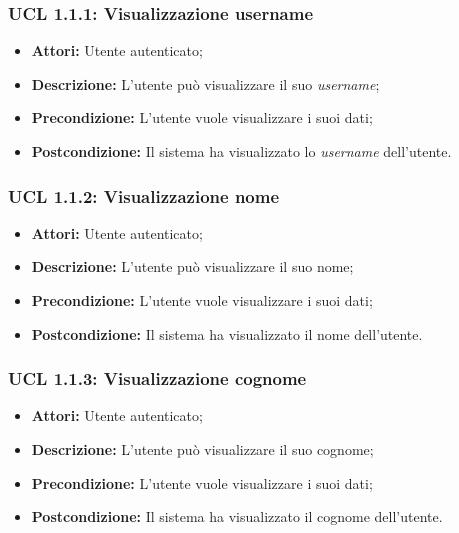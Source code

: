 \hypertarget{L1.1.1}{}
\subsubsection{UCL 1.1.1: Visualizzazione username}
\begin{itemize}
	\item \textbf{Attori:} Utente autenticato;
	\item \textbf{Descrizione:} L'utente può visualizzare il suo \textit{username};
	\item \textbf{Precondizione:} L'utente vuole visualizzare i suoi dati;
\item \textbf{Postcondizione:} Il sistema ha visualizzato lo \textit{username} dell'utente.
\end{itemize}

\hypertarget{L1.1.2}{}
\subsubsection{UCL 1.1.2: Visualizzazione nome}
\begin{itemize}
	\item \textbf{Attori:} Utente autenticato;
	\item \textbf{Descrizione:} L'utente può visualizzare il suo nome;
	\item \textbf{Precondizione:} L'utente vuole visualizzare i suoi dati;
	\item \textbf{Postcondizione:} Il sistema ha visualizzato il nome dell'utente.
\end{itemize}

\hypertarget{L1.1.3}{}
\subsubsection{UCL 1.1.3: Visualizzazione cognome}
\begin{itemize}
	\item \textbf{Attori:} Utente autenticato;
	\item \textbf{Descrizione:} L'utente può visualizzare il suo cognome;
	\item \textbf{Precondizione:} L'utente vuole visualizzare i suoi dati;
	\item \textbf{Postcondizione:} Il sistema ha visualizzato il cognome dell'utente.
\end{itemize}

